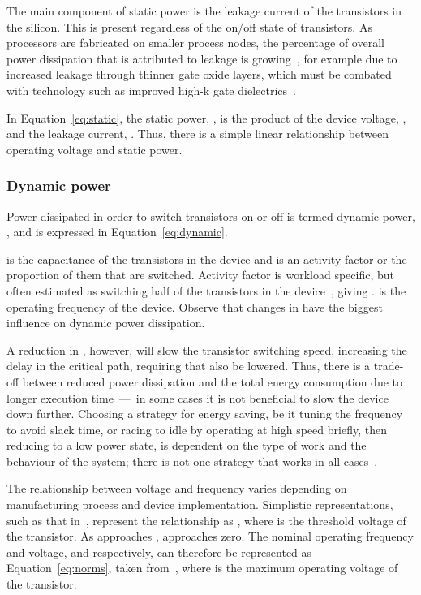\documentclass[a4paper,twocolumn,DIV=16]{scrartcl}
\begin{document}
The main component of static power is the leakage current of the transistors in
the silicon. This is present regardless of the on/off state of transistors. As
processors are fabricated on smaller process nodes, the percentage of overall
power dissipation that is attributed to leakage is
growing~\cite{kim2003leakage}, for example due to increased leakage through
thinner gate oxide layers, which must be combated with technology such as
improved high-k gate dielectrics~\cite{highkreview}.



In Equation~\ref{eq:static}, the static power, , is the product of the
device voltage, , and the leakage current, .  Thus, there is
a simple linear relationship between operating voltage and static power.

\subsubsection*{Dynamic power}

Power dissipated in order to switch transistors on or off is termed dynamic
power, , and is expressed in Equation~\ref{eq:dynamic}.



 is the capacitance of the transistors in the device and 
is an activity factor or the proportion of them that are switched. Activity
factor is workload specific, but often estimated as switching half of the
transistors in the device~\cite{Brooks2000}, giving .  is the
operating frequency of the device. Observe that changes in  have the biggest
influence on dynamic power dissipation.

A reduction in , however, will slow the transistor switching speed,
increasing the delay in the critical path, requiring that  also be lowered.
Thus, there is a trade-off between reduced power dissipation and the total
energy consumption due to longer execution time~---~in some cases it is not
beneficial to slow the device down further. Choosing a strategy for energy
saving, be it tuning the frequency to avoid slack time, or racing to idle by
operating at high speed briefly, then reducing to a low power state, is
dependent on the type of work and the behaviour of the system; there is not one
strategy that works in all cases~\cite{Amur2008}.

The relationship between voltage and frequency varies depending on manufacturing
process and device implementation. Simplistic representations, such as that
in~\cite{kim2003leakage}, represent the relationship as , where  is the threshold voltage of the
transistor. As  approaches ,  approaches zero. The nominal
operating frequency and voltage,  and 
respectively, can therefore be represented as Equation~\ref{eq:norms}, taken
from~\cite{kim2003leakage}, where  is the maximum operating
voltage of the transistor.
\end{document}
